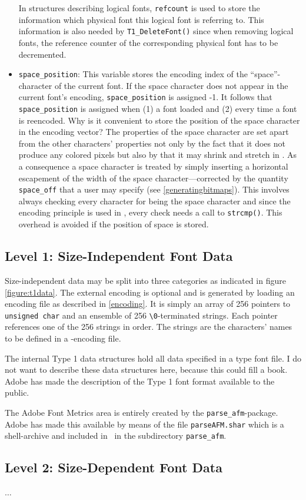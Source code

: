 \begin{itemize}
  In structures describing logical fonts, \verb+refcount+ is used to
  store the information which physical font this logical font is
  referring to. This information is also needed by
  \verb+T1_DeleteFont()+ since when removing logical fonts, the
  reference counter of the corresponding physical font has to be
  decremented.
\item \verb+space_position+: This variable stores the encoding index of the
  ``space''-character of the current font. If the space character does not
  appear in the current font's encoding, \verb+space_position+ is assigned
  -1. It follows that \verb+space_position+
  is assigned when (1) a font loaded and (2) every time a
  font is reencoded. Why is it convenient to store the position of the space
  character in the encoding vector? The properties of the space character are
  set apart from the other characters' properties not only by the fact that it
  does not produce any colored pixels but also by that it may shrink and
  stretch in \tonelib. As a consequence a space character is treated by simply
  inserting a horizontal escapement of the width of the space
  character---corrected by the quantity \verb+space_off+ that a user may
  specify (see \ref{generatingbitmaps}). This involves always checking every
  character for being the space character and since the encoding principle is
  used in \tonelib, every check needs a call to \verb+strcmp()+. This overhead
  is avoided if the position of space is stored.
\end{itemize} 
\subsection{Level 1: Size-Independent Font Data}
\label{sizeindependentfontdata}%
Size-independent data may be split into three categories as indicated in
figure \ref{figure:t1data}. The external encoding is optional and is generated
by loading an encoding file as described in \ref{encoding}. It is simply an
array of 256 pointers to \verb+unsigned char+ and an ensemble of 256
\verb+\0+-terminated strings. Each pointer references one of the 256 strings
in order. The strings are the characters' names to be defined in a
\tonelib-encoding file.

The internal Type 1 data structures hold all data specified in a type font
file. I do not want to describe these data structures here, because this could
fill a book. Adobe has made the description of the Type 1 font format
available to the public. 

The Adobe Font Metrics area is entirely created by the
\verb+parse_afm+-package. Adobe has made this available by means of the file
\verb+parseAFM.shar+ which is a shell-archive and included in \tonelib\ in the
subdirectory \verb+parse_afm+.

\subsection{Level 2: Size-Dependent Font Data}
\label{sizedependentfontdata}%

$\ldots$

